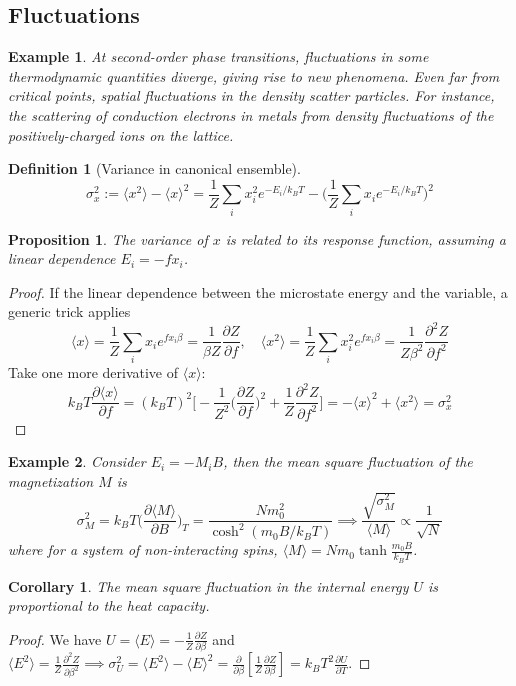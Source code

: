 \documentclass[a4paper]{article}
\newtheorem{eg}{Example}[section]
\theoremstyle{new}
\newtheorem{defi}{Definition}[section]
\newtheorem{prop}{Proposition}[section]
\newtheorem{cor}{Corollary}[section]
\begin{document}
\subsection{Fluctuations}
\begin{eg}
At second-order phase transitions, fluctuations in some thermodynamic quantities diverge, giving rise to new phenomena. Even far from critical points, spatial fluctuations in the density scatter particles. For instance, the scattering of conduction electrons in metals from density fluctuations of the positively-charged ions on the lattice.
\end{eg}
\begin{defi}[Variance in canonical ensemble]
\begin{equation}
\sigma_x^2:=\langle x^2\rangle-\langle x\rangle^2=\frac{1}{Z}\sum_ix_i^2e^{-E_i/k_BT}-\bigg(\frac{1}{Z}\sum_i x_ie^{-E_i/k_BT}\bigg)^2\label{variance}
\end{equation}
\end{defi}
\begin{prop}
The variance of $x$ is related to its response function, assuming a linear dependence $E_i=-fx_i$.
\end{prop}
\begin{proof}
If the linear dependence between the microstate energy and the variable, a generic trick applies
$$\langle x\rangle=\frac{1}{Z}\sum_ix_ie^{fx_i\beta}=\frac{1}{\beta Z}\frac{\partial Z}{\partial f},\quad\langle x^2\rangle=\frac{1}{Z}\sum_ix_i^2e^{fx_i\beta}=\frac{1}{Z\beta^2}\frac{\partial^2Z}{\partial f^2}$$
Take one more derivative of $\langle x\rangle$:
$$k_BT\frac{\partial\langle x\rangle}{\partial f}=(k_BT)^2\bigg[-\frac{1}{Z^2}\bigg(\frac{\partial Z}{\partial f}\bigg)^2+\frac{1}{Z}\frac{\partial^2Z}{\partial f^2}\bigg]=-\langle x\rangle^2+\langle x^2\rangle=\sigma_x^2$$
\end{proof}
\begin{eg}
Consider $E_i=-M_iB$, then the mean square fluctuation of the magnetization $M$ is
$$\sigma_M^2=k_BT\bigg(\frac{\partial\langle M\rangle}{\partial B}\bigg)_T=\frac{Nm_0^2}{\cosh^2(m_0B/k_BT)}\implies\frac{\sqrt{\sigma_M^2}}{\langle M\rangle}\propto\frac{1}{\sqrt{N}}$$
where for a system of non-interacting spins, $\langle M\rangle=Nm_0\tanh\frac{m_0B}{k_BT}$.
\end{eg}
\begin{cor}
The mean square fluctuation in the internal energy $U$ is proportional to the heat capacity.
\end{cor}
\begin{proof}
We have $U=\langle E\rangle=-\frac{1}{Z}\frac{\partial Z}{\partial\beta}$ and $\langle E^2\rangle=\frac{1}{Z}\frac{\partial^2Z}{\partial\beta^2}\implies\sigma_U^2=\langle E^2\rangle-\langle E\rangle^2=\frac{\partial}{\partial\beta}[\frac{1}{Z}\frac{\partial Z}{\partial\beta}]=k_BT^2\frac{\partial U}{\partial T}$.
\end{proof}
\end{document}
